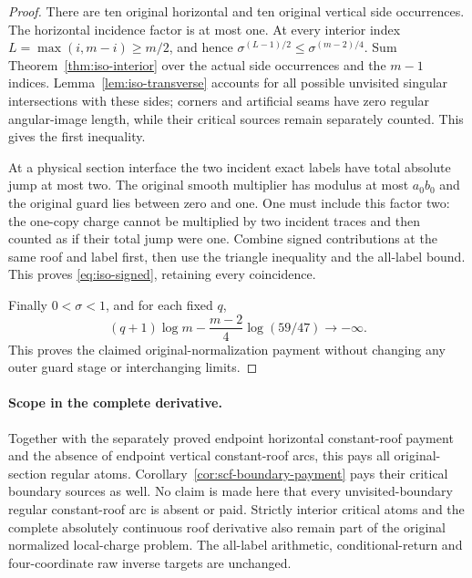 \begin{proof}
There are ten original horizontal and ten original vertical side
occurrences. The horizontal incidence factor is at most one.
At every interior index $L=\max(i,m-i)\ge m/2$, and hence
$\sigma^{(L-1)/2}\le\sigma^{(m-2)/4}$.
Sum Theorem~\ref{thm:iso-interior} over the actual side occurrences
and the $m-1$ indices. Lemma~\ref{lem:iso-transverse} accounts for
all possible unvisited singular intersections with these sides;
corners and artificial seams have zero regular angular-image
length, while their critical sources remain separately counted.
This gives the first inequality.

At a physical section interface the two incident exact labels
have total absolute jump at most two. The original smooth
multiplier has modulus at most $a_0b_0$ and the original guard
lies between zero and one. One must include this factor two:
the one-copy charge cannot be multiplied by two incident traces
and then counted as if their total jump were one.
Combine signed contributions at the same roof and label first,
then use the triangle inequality and the all-label bound.
This proves \eqref{eq:iso-signed}, retaining every coincidence.

Finally $0<\sigma<1$, and for each fixed $q$,
\[
 (q+1)\log m-\frac{m-2}{4}\log(59/47)\longrightarrow-\infty.
\]
This proves the claimed original-normalization payment without
changing any outer guard stage or interchanging limits.
\end{proof}

\paragraph{Scope in the complete derivative.}
Together with the separately proved endpoint horizontal
constant-roof payment and the absence of endpoint vertical
constant-roof arcs, this pays all original-section regular atoms.
Corollary~\ref{cor:scf-boundary-payment} pays their critical
boundary sources as well. No claim is made here that every
unvisited-boundary regular constant-roof arc is absent or paid.
Strictly interior critical atoms and the complete absolutely
continuous roof derivative also remain part of the original
normalized local-charge problem. The all-label arithmetic,
conditional-return and four-coordinate raw inverse targets are
unchanged.

